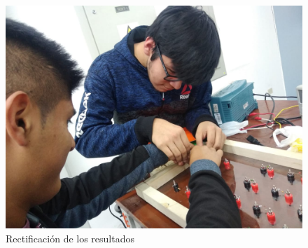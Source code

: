 \documentclass[a4paper,12pt]{report}
\begin{document}
\begin{figure}[H]
\begin{center}
\includegraphics[scale=0.35]{serg.jpeg}
\caption{Rectificación de los resultados}
\end{center}
\end{figure}
\end{document}
